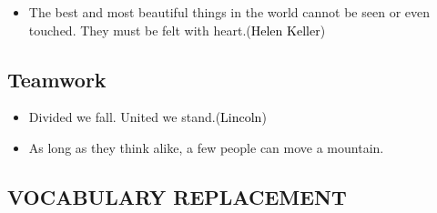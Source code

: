 \documentclass{article}
\begin{document}
\begin{itemize}
\item The best and most beautiful things in the world cannot be seen or even touched. They
  must be felt with heart.(\textcolor{black}{Helen Keller})
\end{itemize}

\subsection{Teamwork}
\label{sec:teamwork}

\begin{itemize}
\item Divided we fall. United we stand.(\textcolor{black}{Lincoln})
\item As long as they think alike, a few people can move a mountain.
\end{itemize}


\begin{center}
  \section{VOCABULARY REPLACEMENT}
\end{center}
\end{document}
